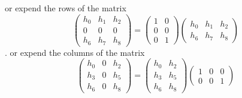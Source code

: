 \documentclass[9pt,twocolumn]{extarticle}
\begin{document}
or expend the rows of the matrix
\[
\left( \begin{array}{ccc}
    h_0 & h_1 & h_2\\
    0 & 0 & 0 \\
    h_6 & h_7 & h_8
  \end{array} \right) = 
\left( \begin{array}{ccc}
    1 & 0\\
    0 & 0\\
    0 & 1
  \end{array} \right)
\left( \begin{array}{ccc}
    h_0 & h_1 & h_2\\
    h_6 & h_7 & h_8
  \end{array} \right)
\].
or expend the columns of the matrix
\[ 
\left( \begin{array}{ccc}
    h_0 & 0 & h_2\\
    h_3 & 0 & h_5\\
    h_6 & 0 & h_8
  \end{array} \right) = 
\left( \begin{array}{cc}
    h_0 & h_2\\
    h_3 & h_5\\
    h_6 & h_8
  \end{array} \right)
\left( \begin{array}{ccc}
    1 & 0& 0\\
    0 & 0& 1
  \end{array} \right)
\]
\end{document}
